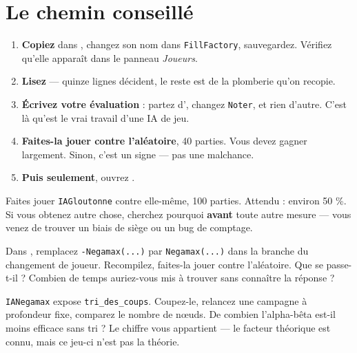 \section{Le chemin conseillé}

\begin{enumerate}
  \item \textbf{Copiez } dans ,
        changez son nom dans \texttt{FillFactory}, sauvegardez. Vérifiez qu'elle
        apparaît dans le panneau \emph{Joueurs}.
  \item \textbf{Lisez } — quinze lignes décident, le reste
        est de la plomberie qu'on recopie.
  \item \textbf{Écrivez votre évaluation} : partez d',
        changez \texttt{Noter}, et rien d'autre. C'est là qu'est le vrai travail
        d'une IA de jeu.
  \item \textbf{Faites-la jouer contre l'aléatoire}, 40 parties. Vous devez
        gagner largement. Sinon, c'est un signe — pas une malchance.
  \item \textbf{Puis seulement}, ouvrez .
\end{enumerate}

\begin{nkexo}
Faites jouer \texttt{IAGloutonne} contre elle-même, 100 parties. Attendu :
environ 50 \%. Si vous obtenez autre chose, cherchez pourquoi \textbf{avant}
toute autre mesure — vous venez de trouver un biais de siège ou un bug de
comptage.
\end{nkexo}

\begin{nkexo}
Dans , remplacez \texttt{-Negamax(...)} par
\texttt{Negamax(...)} dans la branche du changement de joueur. Recompilez,
faites-la jouer contre l'aléatoire. Que se passe-t-il ? Combien de temps
auriez-vous mis à trouver sans connaître la réponse ?
\end{nkexo}

\begin{nkexo}
\texttt{IANegamax} expose \texttt{tri\_des\_coups}. Coupez-le, relancez une
campagne à profondeur fixe, comparez le nombre de nœuds. De combien l'alpha-bêta
est-il moins efficace sans tri ? Le chiffre vous appartient — le facteur théorique
est connu, mais ce jeu-ci n'est pas la théorie.
\end{nkexo}

